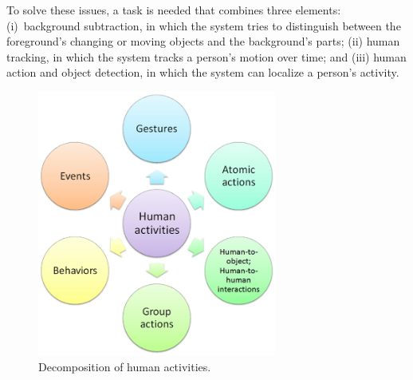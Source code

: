 To solve these issues, a task is needed that combines three elements: (i) background subtraction, in which the system tries to distinguish between the foreground's changing or moving objects and the background's parts;\cite{1032799}\cite{s19061352} (ii) human tracking, in which the system tracks a person's motion over time;\cite{10.1016/j.patcog.2013.10.019} and (iii) human action and object detection, in which the system can localize a person's activity.\cite{Ganetal}

\begin{figure}[H]
\centering
\includegraphics[width=0.7\textwidth]{./figure/chap 3/3.jpg}
\caption{Decomposition of human activities.}
\label{Fig 3.5}
\end{figure}

